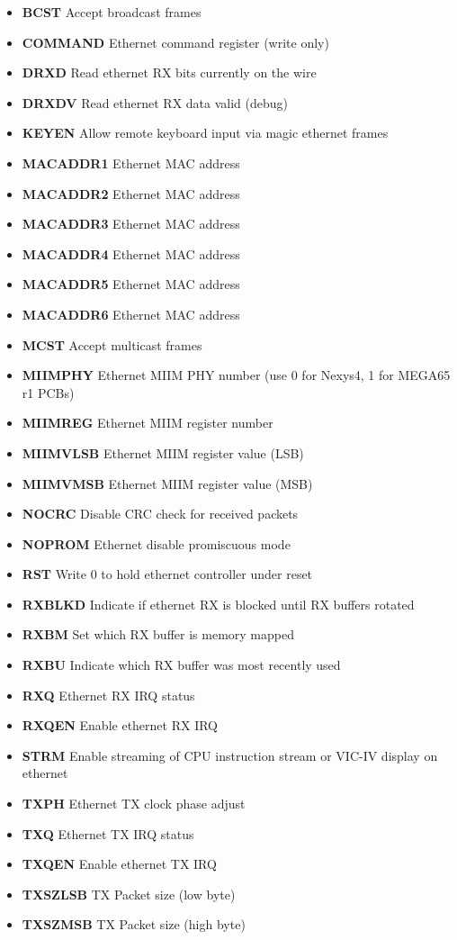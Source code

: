 \begin{itemize}
\item{\bf{BCST}} Accept broadcast frames
\item{\bf{COMMAND}} Ethernet command register (write only)
\item{\bf{DRXD}} Read ethernet RX bits currently on the wire
\item{\bf{DRXDV}} Read ethernet RX data valid (debug)
\item{\bf{KEYEN}} Allow remote keyboard input via magic ethernet frames
\item{\bf{MACADDR1}} Ethernet MAC address
\item{\bf{MACADDR2}} Ethernet MAC address
\item{\bf{MACADDR3}} Ethernet MAC address
\item{\bf{MACADDR4}} Ethernet MAC address
\item{\bf{MACADDR5}} Ethernet MAC address
\item{\bf{MACADDR6}} Ethernet MAC address
\item{\bf{MCST}} Accept multicast frames
\item{\bf{MIIMPHY}} Ethernet MIIM PHY number (use 0 for Nexys4, 1 for MEGA65 r1 PCBs)
\item{\bf{MIIMREG}} Ethernet MIIM register number
\item{\bf{MIIMVLSB}} Ethernet MIIM register value (LSB)
\item{\bf{MIIMVMSB}} Ethernet MIIM register value (MSB)
\item{\bf{NOCRC}} Disable CRC check for received packets
\item{\bf{NOPROM}} Ethernet disable promiscuous mode
\item{\bf{RST}} Write 0 to hold ethernet controller under reset
\item{\bf{RXBLKD}} Indicate if ethernet RX is blocked until RX buffers rotated
\item{\bf{RXBM}} Set which RX buffer is memory mapped
\item{\bf{RXBU}} Indicate which RX buffer was most recently used
\item{\bf{RXQ}} Ethernet RX IRQ status
\item{\bf{RXQEN}} Enable ethernet RX IRQ
\item{\bf{STRM}} Enable streaming of CPU instruction stream or VIC-IV display on ethernet
\item{\bf{TXPH}} Ethernet TX clock phase adjust
\item{\bf{TXQ}} Ethernet TX IRQ status
\item{\bf{TXQEN}} Enable ethernet TX IRQ
\item{\bf{TXSZLSB}} TX Packet size (low byte)
\item{\bf{TXSZMSB}} TX Packet size (high byte)
\end{itemize}
